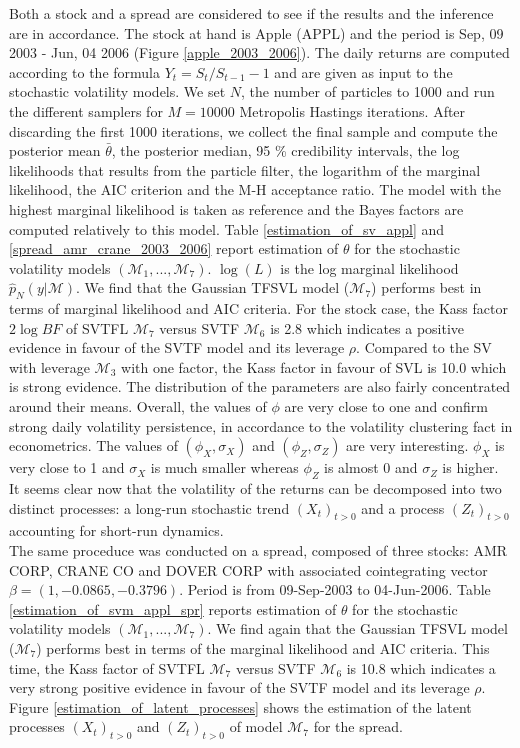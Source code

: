 \documentclass[11pt,a4,twosided,singlespacing,titlepagenumber=on]{scrreprt}
\numberwithin{equation}{chapter} %
\theoremstyle{remark}
\begin{document}
Both a stock and a spread are considered to see if the results and the inference are in accordance. The stock at hand is Apple (APPL) and the period is Sep, 09 2003 - Jun, 04 2006 (Figure \ref{apple_2003_2006}). The daily returns are computed according to the formula $Y_t = S_t / S_{t-1} - 1$ and are given as input to the stochastic volatility models. We set $N$, the number of particles to 1000 and run the different samplers for $M = 10000$ Metropolis Hastings iterations. After discarding the first 1000 iterations, we collect the final sample and compute the posterior mean $\bar{\theta}$, the posterior median, 95 \% credibility intervals, the log likelihoods that results from the particle filter, the logarithm of the marginal likelihood, the AIC criterion and the M-H acceptance ratio. The model with the highest marginal likelihood is taken as reference and the Bayes factors are computed relatively to this model. Table \ref{estimation_of_sv_appl} and \ref{spread_amr_crane_2003_2006} report estimation of $\theta$ for the stochastic volatility models $(\mathcal{M}_1, ..., \mathcal{M}_7)$. $\log (L)$ is the log marginal likelihood $\hat{p}_N(y| \mathcal{M})$. We find that the Gaussian TFSVL model ($\mathcal{M}_7$) performs best in terms of marginal likelihood and AIC criteria. For the stock case, the Kass factor $2 \log BF$ of SVTFL $\mathcal{M}_7$ versus SVTF $\mathcal{M}_6$ is 2.8 which indicates a positive evidence in favour of the SVTF model and its leverage $\rho$. Compared to the SV with leverage $\mathcal{M}_3$ with one factor, the Kass factor in favour of SVL is 10.0 which is strong evidence. The distribution of the parameters are also fairly concentrated around their means. Overall, the values of $\phi$ are very close to one and confirm strong daily volatility persistence, in accordance to the volatility clustering fact in econometrics. The values of $(\phi_X, \sigma_X)$ and $(\phi_Z, \sigma_Z)$ are very interesting. $\phi_X$ is very close to 1 and $\sigma_X$ is much smaller whereas $\phi_Z$ is almost 0 and $\sigma_Z$ is higher. It seems clear now that the volatility of the returns can be decomposed into two distinct processes: a long-run stochastic trend $(X_t)_{t>0}$ and a process $(Z_t)_{t>0}$ accounting for short-run dynamics. \\

The same proceduce was conducted on a spread, composed of three stocks: AMR CORP, CRANE CO and DOVER CORP with associated cointegrating vector $\beta = (1, -0.0865, -0.3796)$. Period is from 09-Sep-2003 to 04-Jun-2006. Table \ref{estimation_of_svm_appl_spr} reports estimation of $\theta$ for the stochastic volatility models $(\mathcal{M}_1, ..., \mathcal{M}_7)$. We find again that the Gaussian TFSVL model ($\mathcal{M}_7$) performs best in terms of the marginal likelihood and AIC criteria. This time, the Kass factor of SVTFL $\mathcal{M}_7$ versus SVTF $\mathcal{M}_6$ is 10.8 which indicates a very strong positive evidence in favour of the SVTF model and its leverage $\rho$. Figure \ref{estimation_of_latent_processes} shows the estimation of the latent processes $(X_t)_{t>0}$ and $(Z_t)_{t>0}$ of model $\mathcal{M}_7$ for the spread. 
\end{document}
